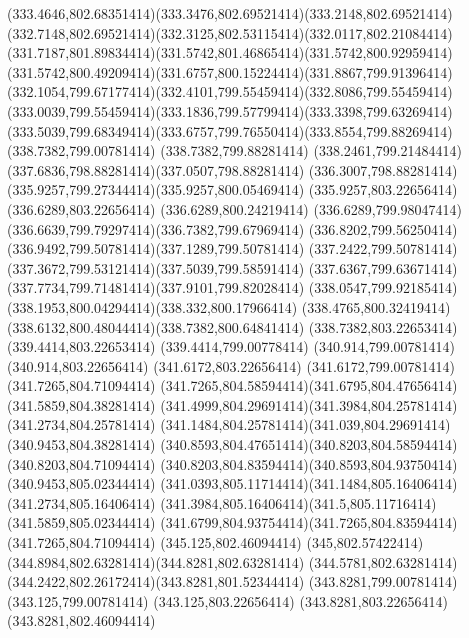 {{	\curveto(333.4646,802.68351414)(333.3476,802.69521414)(333.2148,802.69521414)
	\curveto(332.7148,802.69521414)(332.3125,802.53115414)(332.0117,802.21084414)
	\curveto(331.7187,801.89834414)(331.5742,801.46865414)(331.5742,800.92959414)
	\curveto(331.5742,800.49209414)(331.6757,800.15224414)(331.8867,799.91396414)
	\curveto(332.1054,799.67177414)(332.4101,799.55459414)(332.8086,799.55459414)
	\curveto(333.0039,799.55459414)(333.1836,799.57799414)(333.3398,799.63269414)
	\curveto(333.5039,799.68349414)(333.6757,799.76550414)(333.8554,799.88269414)
	\closepath
	\moveto(338.7382,799.00781414)
	\lineto(338.7382,799.88281414)
	\curveto(338.2461,799.21484414)(337.6836,798.88281414)(337.0507,798.88281414)
	\curveto(336.3007,798.88281414)(335.9257,799.27344414)(335.9257,800.05469414)
	\lineto(335.9257,803.22656414)
	\lineto(336.6289,803.22656414)
	\lineto(336.6289,800.24219414)
	\curveto(336.6289,799.98047414)(336.6639,799.79297414)(336.7382,799.67969414)
	\curveto(336.8202,799.56250414)(336.9492,799.50781414)(337.1289,799.50781414)
	\curveto(337.2422,799.50781414)(337.3672,799.53121414)(337.5039,799.58591414)
	\curveto(337.6367,799.63671414)(337.7734,799.71481414)(337.9101,799.82028414)
	\curveto(338.0547,799.92185414)(338.1953,800.04294414)(338.332,800.17966414)
	\curveto(338.4765,800.32419414)(338.6132,800.48044414)(338.7382,800.64841414)
	\lineto(338.7382,803.22653414)
	\lineto(339.4414,803.22653414)
	\lineto(339.4414,799.00778414)
	\closepath
	\moveto(340.914,799.00781414)
	\lineto(340.914,803.22656414)
	\lineto(341.6172,803.22656414)
	\lineto(341.6172,799.00781414)
	\closepath
	\moveto(341.7265,804.71094414)
	\curveto(341.7265,804.58594414)(341.6795,804.47656414)(341.5859,804.38281414)
	\curveto(341.4999,804.29691414)(341.3984,804.25781414)(341.2734,804.25781414)
	\curveto(341.1484,804.25781414)(341.039,804.29691414)(340.9453,804.38281414)
	\curveto(340.8593,804.47651414)(340.8203,804.58594414)(340.8203,804.71094414)
	\curveto(340.8203,804.83594414)(340.8593,804.93750414)(340.9453,805.02344414)
	\curveto(341.0393,805.11714414)(341.1484,805.16406414)(341.2734,805.16406414)
	\curveto(341.3984,805.16406414)(341.5,805.11716414)(341.5859,805.02344414)
	\curveto(341.6799,804.93754414)(341.7265,804.83594414)(341.7265,804.71094414)
	\closepath
	\moveto(345.125,802.46094414)
	\curveto(345,802.57422414)(344.8984,802.63281414)(344.8281,802.63281414)
	\curveto(344.5781,802.63281414)(344.2422,802.26172414)(343.8281,801.52344414)
	\lineto(343.8281,799.00781414)
	\lineto(343.125,799.00781414)
	\lineto(343.125,803.22656414)
	\lineto(343.8281,803.22656414)
	\lineto(343.8281,802.46094414)
}}
